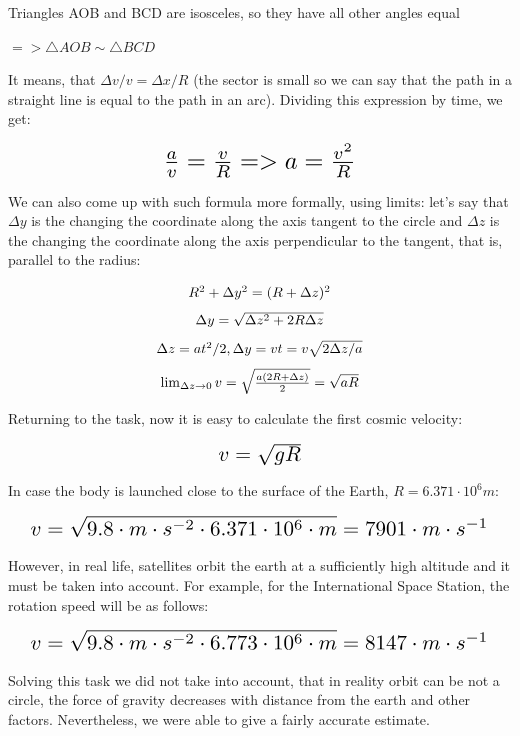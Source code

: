 \documentclass[a4paper,10pt]{article}
\begin{document}
\par
Triangles AOB and BCD are isosceles, so they have all other angles equal
\par
$=> \triangle AOB \sim \triangle BCD$
\par
It means, that $\Delta v / v = \Delta x / R$ (the sector is small so we can say that the path in a straight line is equal to the path in an arc). Dividing this expression by time, we get:
\begin{center}
\[ \scalebox{1.75}{$\frac{a}{v} = \frac{v}{R} => a = \frac{v^2}{R}$} \]
\end{center}
We can also come up with such formula more formally, using limits: let's say that $\Delta y$ is the changing the coordinate along the axis tangent to the circle and $\Delta z$ is the changing the coordinate along the axis perpendicular to the tangent, that is, parallel to the radius:
\begin{center}
\[ \scalebox{1}{$R^2 + \Delta y^2 = (R + \Delta z)^2$} \]
\[ \scalebox{1}{$\Delta y = \sqrt{\Delta z^2 + 2R\Delta z}$} \]
\[ \scalebox{1}{$\Delta z = at^2 / 2, \Delta y = vt = v\sqrt{2\Delta z / a}$} \]
\[ \scalebox{1}{$\lim_{\Delta z\to 0} v = \sqrt{\frac{a(2R + \Delta z)}{2}} = \sqrt{aR}$} \]
\end{center}
Returning to the task, now it is easy to calculate the first cosmic velocity:
\begin{center}
\[ \scalebox{1.5}{$v = \sqrt{gR}$} \]
\end{center}
In case the body is launched close to the surface of the Earth, $R = 6.371 \cdot 10^6 m$:
\begin{center}
\[ \scalebox{1.5}{$v = \sqrt{9.8 \cdot m \cdot s^{-2} \cdot 6.371 \cdot 10^6 \cdot m} = 7901 \cdot m \cdot s^{-1}$} \]
\end{center}
However, in real life, satellites orbit the earth at a sufficiently high altitude and it must be taken into account. For example, for the International Space Station, the rotation speed will be as follows:
\begin{center}
\[ \scalebox{1.5}{$v = \sqrt{9.8 \cdot m \cdot s^{-2} \cdot 6.773 \cdot 10^6 \cdot m} = 8147 \cdot m \cdot s^{-1}$} \]
\end{center}
Solving this task we did not take into account, that in reality orbit can be not a circle, the force of gravity decreases with distance from the earth and other factors. Nevertheless, we were able to give a fairly accurate estimate.
\end{document}
